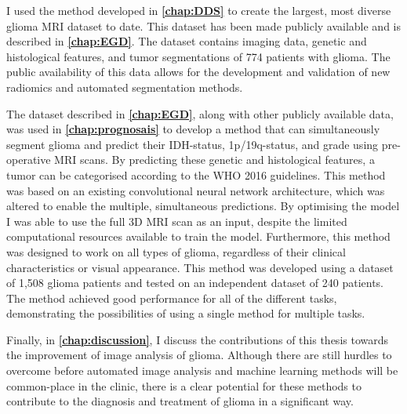 I used the method developed in \textbf{\cref{chap:DDS}} to create the largest, most diverse glioma \gls{MRI} dataset to date.
This dataset has been made publicly available and is described in \textbf{\cref{chap:EGD}}.
The dataset contains imaging data, genetic and histological features, and tumor segmentations of 774 patients with glioma.
The public availability of this data allows for the development and validation of new radiomics and automated segmentation methods.

The dataset described in \textbf{\cref{chap:EGD}}, along with other publicly available data, was used in \textbf{\cref{chap:prognosais}} to develop a method that can simultaneously segment glioma and predict their \gls{IDH}-status, 1p/19q-status, and grade using pre-operative \gls{MRI} scans.
By predicting these genetic and histological features, a \gls{tumor} can be categorised according to the \gls{WHO} 2016 guidelines.
This method was based on an existing convolutional neural network architecture, which was altered to enable the multiple, simultaneous predictions.
By optimising the model I was able to use the full 3D \gls{MRI} scan as an input, despite the limited computational resources available to train the model.
Furthermore, this method was designed to work on all types of glioma, regardless of their clinical characteristics or visual appearance.
This method was developed using a dataset of 1,508 glioma patients and tested on an independent dataset of 240 patients.
The method achieved good performance for all of the different tasks, demonstrating the possibilities of using a single method for multiple tasks.

Finally, in \textbf{\cref{chap:discussion}}, I discuss the contributions of this thesis towards the improvement of image analysis of glioma.
Although there are still hurdles to overcome before automated image analysis and machine learning methods will be common-place in the clinic, there is a clear potential for these methods to contribute to the diagnosis and treatment of glioma in a significant way.

